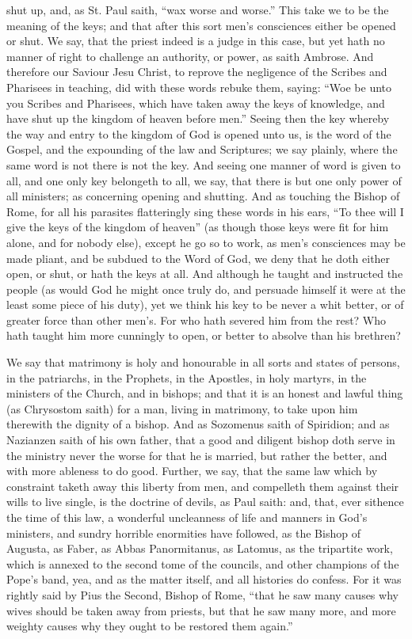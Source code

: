 shut up, and, as St. Paul saith, “wax worse and worse.”
This take we to be the meaning of the keys; and that after this sort
men’s consciences either be opened or shut. We say, that
the priest indeed is a judge in this case, but yet hath no manner of
right to challenge an authority, or power, as saith Ambrose. And
therefore our Saviour Jesu Christ, to reprove the
negligence of the Scribes and Pharisees in teaching, did with these
words rebuke them, saying: “Woe be unto you Scribes and Pharisees,
which have taken away the keys of knowledge, and have shut up the kingdom
of heaven before men.” Seeing then the key whereby the way
and entry to the kingdom of God is opened unto us, is the word of the
Gospel, and the expounding of the law and Scriptures; we say plainly,
where the same word is not there is not the key. And seeing one
manner of word is given to all, and one only key belongeth to all, we
say, that there is but one only power of all ministers; as concerning
opening and shutting. And as touching the Bishop of Rome, for
all his parasites flatteringly sing these words in his ears, “To
thee will I give the keys of the kingdom of heaven” (as though
those keys were fit for him alone, and for nobody else), except he go
so to work, as men’s consciences may be made pliant, and be subdued
to the Word of God, we deny that he doth either open, or shut, or hath
the keys at all. And although he taught and instructed the people
(as would God he might once truly do, and persuade himself it were at
the least some piece of his duty), yet we think his key to be never
a whit better, or of greater force than other men’s. For
who hath severed
him from the rest? Who hath taught him more cunningly to open,
or better to absolve than his brethren?

We say that matrimony is holy and honourable in all sorts and states
of persons, in the patriarchs, in the Prophets, in the Apostles, in
holy martyrs, in the ministers of the Church, and in bishops; and that
it is an honest and lawful thing (as Chrysostom saith) for a man, living
in matrimony, to take upon him therewith the dignity of a bishop.
And as Sozomenus saith of Spiridion; and as Nazianzen saith of his own
father, that a good and diligent bishop doth serve in the ministry never
the worse for that he is married, but rather the better, and with more
ableness to do good. Further, we say, that the same law which
by constraint taketh away this liberty from men, and compelleth them
against their wills to live single, is the doctrine of devils, as Paul
saith: and, that, ever sithence the time of this law, a wonderful uncleanness
of life and manners in God’s ministers, and sundry horrible enormities
have followed, as the Bishop of Augusta, as Faber, as Abbas Panormitanus,
as Latomus, as the tripartite work, which is annexed to the second tome
of the councils, and other champions of the Pope’s band, yea,
and as the matter itself, and all histories do confess. For it
was
rightly said by Pius the Second, Bishop of Rome, “that he saw
many causes why wives should be taken away from priests, but that he
saw many more, and more weighty causes why they ought to be restored
them again.”

